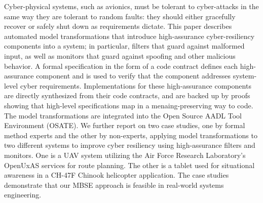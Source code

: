 Cyber-physical systems, such as avionics, must be tolerant to
cyber-attacks in the same way they are tolerant to random faults: they
should either gracefully recover or safely shut down as requirements dictate.
%
%
This paper describes automated model transformations that introduce
high-assurance cyber-resiliency components into a system; in
particular, filters that guard against malformed input, as well as
monitors that guard against spoofing and other malicious behavior. A
formal specification in the form of a code contract defines each
high-assurance component and is used to verify that the component
addresses system-level cyber requirements. Implementations for these
high-assurance components are directly synthesized from their code
contracts, and are backed up by proofs showing that high-level
specifications map in a menaing-preserving way to code. The model
transformations are integrated into the Open Source AADL Tool
Environment (OSATE).  We further report on two case studies, one by
formal method experts and the other by non-experts, applying model
transformations to two different systems to improve cyber resiliency
using high-assurance filters and monitors.  One is a UAV system
utilizing the Air Force Research Laboratory's OpenUxAS services for
route planning.  The other is a tablet used for situational awareness
in a CH-47F Chinook helicopter application.  The case studies
demonstrate that our MBSE approach is feasible in real-world systems
engineering.
